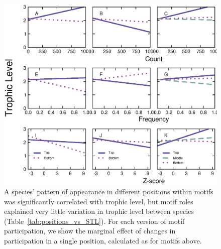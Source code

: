 \documentclass[12pt]{article}
\begin{document}
\begin{spacing}{2.0}
		    \begin{figure}[ht!]
		        \centering
		        \includegraphics[width=\textwidth]{figures/positions_vs_TL_all.eps}
		        \caption{A species' pattern of appearance in different positions within motifs was significantly correlated with trophic level, but motif roles explained very little variation in trophic level between species (Table~\ref{tab:positions_vs_STL}). For each version of motif participation, we show the marginal effect of changes in participation in a single position, calculated as for motifs above.}
		        \label{fig:positions_TL}
			    \end{figure}



\end{spacing}
\end{document}
